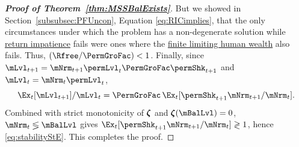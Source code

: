 \documentclass[\econtexRoot/BufferStockTheory]{subfiles}
\begin{document}
\begin{proof}[\textbf{Proof of Theorem~\ref{thm:MSSBalExists}}]
But we showed in Section~\ref{subsubsec:PFUncon}, Equation \eqref{eq:RICimplies}, that the only circumstances under which the problem has a non-degenerate solution while \hyperlink{RIC}{return impatience} fails were ones where the \hyperlink{FHWC}{finite limiting human wealth} also fails.
Thus, $(\Rfree/\PermGroFac) < 1$.
Finally, since $\mLvl_{t+1}=\mNrm_{t+1}\permLvl_{t}\PermGroFac\permShk_{t+1}$ and $\mLvl_{t}=\mNrm_{t}\permLvl_{t}$,
\begin{equation*}
\Ex_{t}[\mLvl_{t+1}]/\mLvl_{t} = \PermGroFac\,\Ex_{t}[\permShk_{t+1}\mNrm_{t+1}/\mNrm_{t}].
\end{equation*}
Combined with strict monotonicity of $\pmb{\zeta}$ and $\difFunc(\mBalLvl)=0$, $\mNrm_t\lessgtr\mBalLvl$ gives $\Ex_{t}[\permShk_{t+1}\mNrm_{t+1}/\mNrm_{t}]\gtrless1$, hence \eqref{eq:stabilityStE}.
This completes the proof.


\end{proof}
\end{document}
